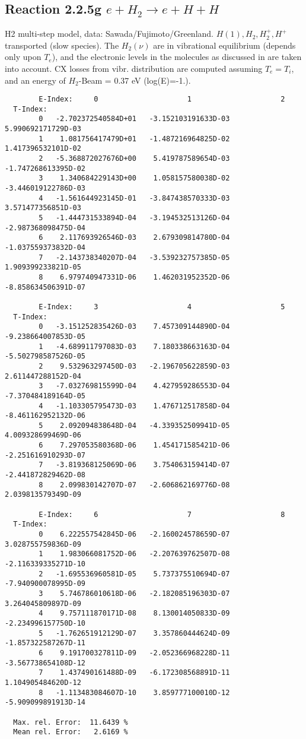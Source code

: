 \subsection{
Reaction 2.2.5g   $e + H_2   \rightarrow e + H + H  $
}

H2 multi-step model,
data: Sawada/Fujimoto/Greenland.
$  H(1), H_2, H_2^+, H^+ $ transported (slow species).
The $H_2(\nu)$ are in vibrational equilibrium
(depends only upon $T_e$), and the electronic levels
in the molecules as discussed in \cite{kn:Sawada} are taken into
account. CX losses from vibr. distribution are computed assuming $T_e =
T_i$, and an energy of $H_2$-Beam  = 0.37 eV (log(E)=-1.).
\begin{verbatim}
        E-Index:     0                     1                     2
  T-Index:
        0   -2.702372540584D+01   -3.152103191633D-03    5.990692171729D-03
        1    1.081756417479D+01   -1.487216964825D-02    1.417396532101D-02
        2   -5.368872027676D+00    5.419787589654D-03   -1.747268613395D-02
        3    1.340684229143D+00    1.058157580038D-02   -3.446019122786D-03
        4   -1.561644923145D-01   -3.847438570333D-03    3.571477356851D-03
        5   -1.444731533894D-04   -3.194532513126D-04   -2.987368098475D-04
        6    2.117693926546D-03    2.679309814780D-04   -1.037559373832D-04
        7   -2.143738340207D-04   -3.539232757385D-05    1.909399233821D-05
        8    6.979740947331D-06    1.462031952352D-06   -8.858634506391D-07

        E-Index:     3                     4                     5
  T-Index:
        0   -3.151252835426D-03    7.457309144890D-04   -9.238664007853D-05
        1   -4.689911797083D-03    7.180338663163D-04   -5.502798587526D-05
        2    9.532963297450D-03   -2.196705622859D-03    2.611447288152D-04
        3   -7.032769815599D-04    4.427959286553D-04   -7.370484189164D-05
        4   -1.103305795473D-03    1.476712517858D-04   -8.461162952132D-06
        5    2.092094838648D-04   -4.339352509941D-05    4.009328699469D-06
        6    7.297053580368D-06    1.454171585421D-06   -2.251616910293D-07
        7   -3.819368125069D-06    3.754063159414D-07   -2.441872829462D-08
        8    2.099830142707D-07   -2.606862169776D-08    2.039813579349D-09

        E-Index:     6                     7                     8
  T-Index:
        0    6.222557542845D-06   -2.160024578659D-07    3.028755759836D-09
        1    1.983066081752D-06   -2.207639762507D-08   -2.116339335271D-10
        2   -1.695536960581D-05    5.737375510694D-07   -7.940900078995D-09
        3    5.746786010618D-06   -2.182085196303D-07    3.264045809897D-09
        4    9.757111870171D-08    8.130014050833D-09   -2.234996157750D-10
        5   -1.762651912129D-07    3.357860444624D-09   -1.857322587267D-11
        6    9.191700327811D-09   -2.052366968228D-11   -3.567738654108D-12
        7    1.437490161488D-09   -6.172308568891D-11    1.104905484620D-12
        8   -1.113483084607D-10    3.859777100010D-12   -5.909099891913D-14

  Max. rel. Error:  11.6439 %
  Mean rel. Error:   2.6169 %
\end{verbatim}
